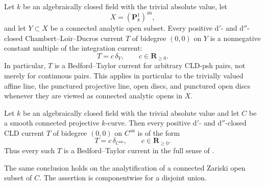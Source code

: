 \begin{proposition}
\label{prop:p213-triv-p1-current-rigidity}
Let $k$ be an algebraically closed field with the trivial absolute value,
let
\[
                         X=(\mathbf P^1_k)^{\mathrm{an}},
\]
and let $Y\subset X$ be a connected analytic open subset.  Every positive
$\mathrm d'$- and $\mathrm d''$-closed Chambert--Loir--Ducros current
$T$ of bidegree $(0,0)$ on $Y$ is a nonnegative constant multiple of
the integration current:
\begin{equation}
                         T=c\,\delta_Y,
            \qquad c\in\mathbf R_{\geq0}.
\label{eq:p213-triv-p1-classification}
\end{equation}
In particular, $T$ is a Bedford--Taylor current for arbitrary CLD-psh
pairs, not merely for continuous pairs.  This applies in particular to the
trivially valued affine line, the punctured projective line, open discs,
and punctured open discs whenever they are viewed as connected analytic
opens in $X$.
\end{proposition}

\begin{proposition}
\label{prop:p213-triv-algebraic-curve-current-rigidity}
Let $k$ be an algebraically closed field with the trivial absolute value
and let $C$ be a smooth connected projective $k$-curve.  Then every
positive $\mathrm d'$- and $\mathrm d''$-closed CLD current $T$ of
bidegree $(0,0)$ on $C^{\mathrm{an}}$ is of the form
\begin{equation}
                         T=c\,\delta_{C^{\mathrm{an}}},
            \qquad c\in\mathbf R_{\geq0}.
\label{eq:p213-triv-curve-classification}
\end{equation}
Thus every such $T$ is a Bedford--Taylor current in the full sense of
\cite[Definition~8.6.2]{CLD25}.

The same conclusion holds on the analytification of a connected Zariski
open subset of $C$.  The assertion is componentwise for a disjoint union.
\end{proposition}

